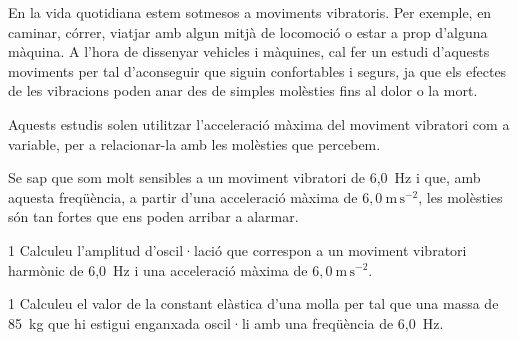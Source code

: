 En la vida quotidiana estem sotmesos a moviments vibratoris. Per exemple, en caminar, córrer, viatjar amb algun mitjà de locomoció o estar a prop d'alguna màquina. A l'hora de dissenyar vehicles i màquines, cal fer un estudi d'aquests moviments per tal d'aconseguir que siguin confortables i segurs, ja que els efectes de les vibracions poden anar des de simples molèsties fins al dolor o la mort.

Aquests estudis solen utilitzar l'acceleració màxima del moviment vibratori com a variable, per a relacionar-la amb les molèsties que percebem.

Se sap que som molt sensibles a un moviment vibratori de 6,0~Hz i que, amb aquesta freqüència, a partir d'una acceleració màxima de $6,0\ \mathrm{m\,s^{-2}}$, les molèsties són tan fortes que ens poden arribar a alarmar.

\begin{apartat}{1}
Calculeu l'amplitud d'oscil·lació que correspon a un moviment vibratori harmònic de 6,0~Hz i una acceleració màxima de $6,0\ \mathrm{m\,s^{-2}}$.
\end{apartat}

\begin{apartat}{1}
Calculeu el valor de la constant elàstica d'una molla per tal que una massa de 85~kg que hi estigui enganxada oscil·li amb una freqüència de 6,0~Hz.
\end{apartat}
